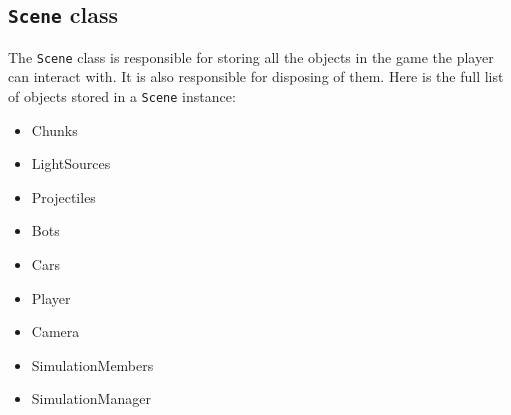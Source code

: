 \subsection{\texttt{Scene} class}
The \texttt{Scene} class is responsible for storing all the objects in the game the player can interact with.
It is also responsible for disposing of them.
Here is the full list of objects stored in a \texttt{Scene} instance:

\begin{itemize}
    \item Chunks
    \item LightSources
    \item Projectiles
    \item Bots
    \item Cars
    \item Player
    \item Camera
    \item SimulationMembers
    \item SimulationManager
\end{itemize}
